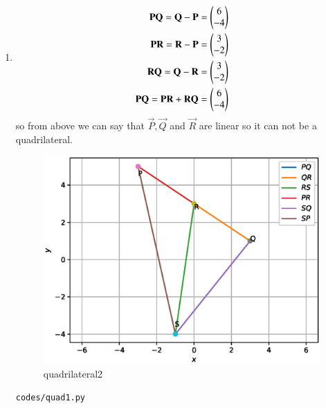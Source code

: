 \begin{enumerate}[label=\arabic*.,ref=\thesubsection.\theenumi]
\item 
\begin{align}
\mathbf{PQ} = \mathbf{Q} - \mathbf{P} = \begin{pmatrix}6\\-4\end{pmatrix}
\\
\mathbf{PR} = \mathbf{R} - \mathbf{P} = \begin{pmatrix}3\\-2\end{pmatrix}
\\
\mathbf{RQ} = \mathbf{Q} - \mathbf{R} = \begin{pmatrix}3\\-2\end{pmatrix}
\\
\mathbf{PQ} = \mathbf{PR} + \mathbf{RQ} = \begin{pmatrix}6\\-4\end{pmatrix}
\end{align}
so from above we can say that $\vec P,\vec Q$ and $\vec R$ are linear so it can not be a quadrilateral.

\begin{figure}[!ht]
	\centering
	\includegraphics[width=\columnwidth]{./figures/quad2.eps}
	\caption{quadrilateral2 }
	\label{fig:quadrilateral2}
\end{figure}
\begin{lstlisting}
codes/quad1.py
\end{lstlisting}
\end{enumerate}